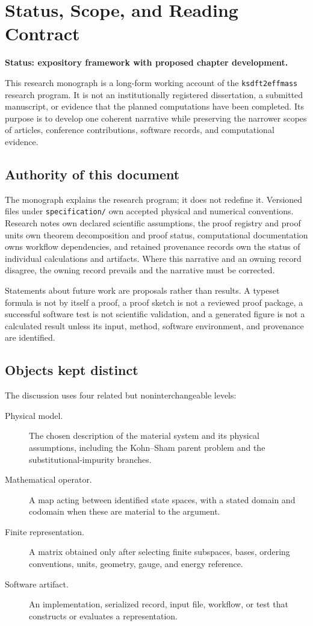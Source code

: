\chapter{Status, Scope, and Reading Contract}
\label{ch:status-and-scope}

\textbf{Status: expository framework with proposed chapter development.}

This research monograph is a long-form working account of the
\texttt{ksdft2effmass} research program. It is not an institutionally
registered dissertation, a submitted manuscript, or evidence that the planned
computations have been completed. Its purpose is to develop one coherent
narrative while preserving the narrower scopes of articles, conference
contributions, software records, and computational evidence.

\section{Authority of this document}

The monograph explains the research program; it does not redefine it. Versioned
files under \texttt{specification/} own accepted physical and numerical
conventions. Research notes own declared scientific assumptions, the proof registry and
proof units own theorem decomposition and proof status, computational
documentation owns workflow dependencies, and retained provenance records own
the status of individual calculations and artifacts. Where this narrative and
an owning record disagree, the owning record prevails and the narrative must be
corrected.

Statements about future work are proposals rather than results. A typeset formula is not by itself a proof, a proof sketch is not a reviewed
proof package, a successful software test is not scientific validation, and a
generated figure is not a calculated result unless its input,
method, software environment, and provenance are identified.

\section{Objects kept distinct}

The discussion uses four related but noninterchangeable levels:

\begin{description}
  \item[Physical model.] The chosen description of the material system and its
    physical assumptions, including the Kohn--Sham parent problem and the
    substitutional-impurity branches.
  \item[Mathematical operator.] A map acting between identified state spaces,
    with a stated domain and codomain when these are material to the argument.
  \item[Finite representation.] A matrix obtained only after selecting finite
    subspaces, bases, ordering conventions, units, geometry, gauge, and energy
    reference.
  \item[Software artifact.] An implementation, serialized record, input file,
    workflow, or test that constructs or evaluates a representation.
\end{description}

